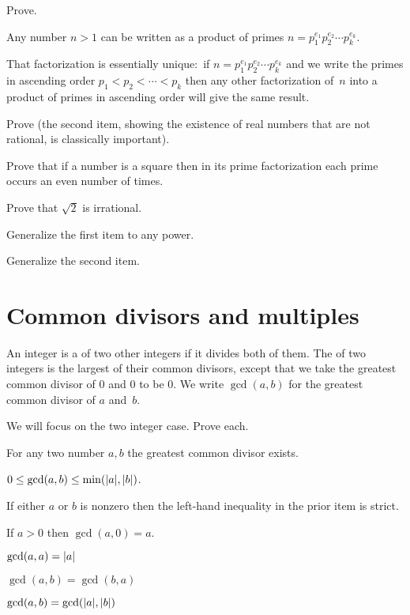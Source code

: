 \documentclass{ibl}
\begin{document}
\begin{ex}  Prove.
\begin{exes}
\item Any number $n>1$ can be written as a product of primes
$n=p_1^{e_1}p_2^{e_2}\cdots p_k^{e_k}$.
\item That factorization is essentially unique:~if 
$n=p_1^{e_1}p_2^{e_2}\cdots p_k^{e_k}$ and we write the primes
in ascending order $p_1<p_2<\cdots<p_k$ then any other
factorization of~$n$ into a product of primes in ascending order will give the
same result.      
\end{exes}
\end{ex}

\begin{ex} Prove (the second item, showing the existence of real numbers that
are not rational, is classically important).
\begin{exes}
\item Prove that if a number is a square then in its prime factorization 
  each prime occurs an even number of times.
\item Prove that $\sqrt{2}$ is irrational.
\item Generalize the first item to any power.
\item Generalize the second item.    
\end{exes}
\end{ex}


\section{Common divisors and multiples}

\begin{df}
An integer is a  of two other integers if it
divides both of them.
The  of two integers 
is the largest of their common divisors,
except that we take the greatest common divisor of $0$ and $0$ 
to be $0$.
We write $\gcd(a,b)$ for the greatest common divisor
of $a$ and~$b$.
\end{df}


\begin{ex}
We will focus on the two integer case.  Prove each.
\begin{exes} 
\item For any two number $a,b$ the greatest common divisor exists.
\item $0\leq \gcd(a,b)\leq\min(\lvert a\rvert,\lvert b\rvert)$.
\item If either $a$ or $b$ is nonzero then the left-hand
  inequality in the prior item is strict.
\item If $a>0$ then $\gcd(a,0)=a$.
\item $\gcd(a,a)=\lvert a\rvert$
\item $\gcd(a,b)=\gcd(b,a)$
\item $\gcd(a,b)=\gcd(\lvert a\rvert,\lvert b\rvert)$
\end{exes}  
\end{ex}
\end{document}

